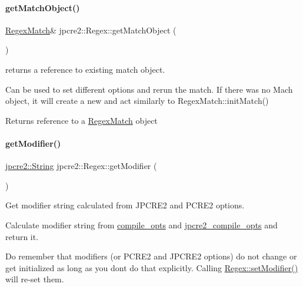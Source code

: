 \paragraph{\texorpdfstring{get\+Match\+Object()}{getMatchObject()}}
{\footnotesize\ttfamily \hyperlink{classjpcre2_1_1RegexMatch}{Regex\+Match}\& jpcre2\+::\+Regex\+::get\+Match\+Object (\begin{DoxyParamCaption}{ }\end{DoxyParamCaption})\hspace{0.3cm}{\ttfamily [inline]}}



returns a reference to existing match object. 

Can be used to set different options and rerun the match. If there was no Mach object, it will create a new and act similarly to Regex\+Match\+::init\+Match() \begin{DoxyReturn}{Returns}
reference to a \hyperlink{classjpcre2_1_1RegexMatch}{Regex\+Match} object 
\end{DoxyReturn}
\hypertarget{classjpcre2_1_1Regex_a0ac4e063f00128b96cd94c33609dc559_a0ac4e063f00128b96cd94c33609dc559}{}\label{classjpcre2_1_1Regex_a0ac4e063f00128b96cd94c33609dc559_a0ac4e063f00128b96cd94c33609dc559} 
\paragraph{\texorpdfstring{get\+Modifier()}{getModifier()}}
{\footnotesize\ttfamily \hyperlink{namespacejpcre2_a91f03070152fb228bc116c5a737f1d16}{jpcre2\+::\+String} jpcre2\+::\+Regex\+::get\+Modifier (\begin{DoxyParamCaption}{ }\end{DoxyParamCaption})}



Get modifier string calculated from J\+P\+C\+R\+E2 and P\+C\+R\+E2 options. 

Calculate modifier string from \hyperlink{classjpcre2_1_1Regex_a5954131e9085de63229ed5c11417df69}{compile\+\_\+opts} and \hyperlink{classjpcre2_1_1Regex_abdd26c3bc1c3132f0aa73dde1690a7ef}{jpcre2\+\_\+compile\+\_\+opts} and return it.

Do remember that modifiers (or P\+C\+R\+E2 and J\+P\+C\+R\+E2 options) do not change or get initialized as long as you don\textquotesingle{}t do that explicitly. Calling \hyperlink{classjpcre2_1_1Regex_aed9865b58c60945e19f36fa310f5a595_aed9865b58c60945e19f36fa310f5a595}{Regex\+::set\+Modifier()} will re-\/set them.

